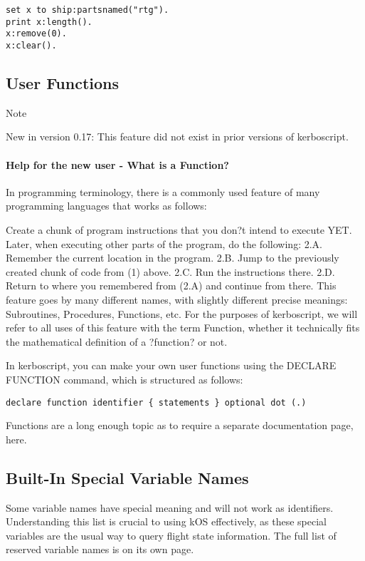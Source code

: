 \begin{Verbatim}[frame=single]
set x to ship:partsnamed("rtg").
print x:length().
x:remove(0).
x:clear().
\end{Verbatim}

\subsection{User Functions}
Note

New in version 0.17: This feature did not exist in prior versions of kerboscript.
\paragraph{Help for the new user - What is a Function?}
In programming terminology, there is a commonly used feature of many programming languages that works as follows:

Create a chunk of program instructions that you don?t intend to execute YET.
Later, when executing other parts of the program, do the following:
2.A. Remember the current location in the program.
2.B. Jump to the previously created chunk of code from (1) above.
2.C. Run the instructions there.
2.D. Return to where you remembered from (2.A) and continue from there.
This feature goes by many different names, with slightly different precise meanings: Subroutines, Procedures, Functions, etc. For the purposes of kerboscript, we will refer to all uses of this feature with the term Function, whether it technically fits the mathematical definition of a ?function? or not.

In kerboscript, you can make your own user functions using the DECLARE FUNCTION command, which is structured as follows:

\begin{Verbatim}[frame=single]
declare function identifier { statements } optional dot (.)
\end{Verbatim}

Functions are a long enough topic as to require a separate documentation page, here.

\subsection{Built-In Special Variable Names}
Some variable names have special meaning and will not work as identifiers. Understanding this list is crucial to using kOS effectively, as these special variables are the usual way to query flight state information. The full list of reserved variable names is on its own page.


